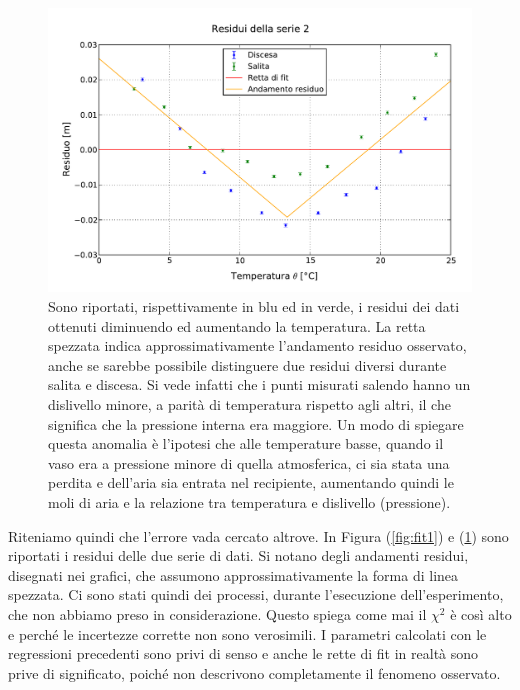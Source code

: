 \begin{figure}[p]
    \centering
    \includegraphics[width=117mm]{immagini/fit2.pdf}
    \caption{Sono riportati, rispettivamente in blu ed in verde, i residui dei dati ottenuti diminuendo ed aumentando la temperatura.
    La retta spezzata indica approssimativamente l'andamento residuo osservato, anche se sarebbe possibile distinguere due residui
    diversi durante salita e discesa. Si vede infatti che i punti misurati salendo hanno un dislivello minore, a parità di temperatura
    rispetto agli altri, il che significa che la pressione interna era maggiore. Un modo di spiegare questa anomalia è l'ipotesi che
    alle temperature basse, quando il vaso era a pressione minore di quella atmosferica, ci sia stata una perdita e dell'aria sia entrata
    nel recipiente, aumentando quindi le moli di aria e la relazione tra temperatura e dislivello (pressione).}
    \label{fig:fit2}
\end{figure}

Riteniamo quindi che l'errore vada cercato altrove. In Figura (\ref{fig:fit1}) e (\ref{fig:fit2}) sono riportati i residui delle due
serie di dati. Si notano degli andamenti residui, disegnati nei grafici, che assumono approssimativamente la forma di linea spezzata.
Ci sono stati quindi dei processi, durante l'esecuzione dell'esperimento, che non abbiamo preso in considerazione.
Questo spiega come mai il $\chi^2$ è così alto e perché le incertezze corrette non sono verosimili. I parametri calcolati con
le regressioni precedenti sono privi di senso e anche le rette di fit in realtà sono prive di significato, poiché non
descrivono completamente il fenomeno osservato.
